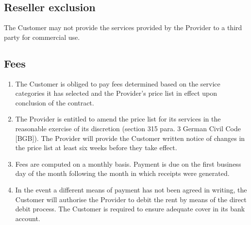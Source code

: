 \documentclass{terms}
\begin{document}
\subsection{Reseller exclusion}
The Customer may not provide the services provided by the Provider to a third party for commercial use.
\subsection{Fees}
\begin{enumerate}
\item The Customer is obliged to pay fees determined based on the service categories it has selected and the Provider's price list in effect upon conclusion of the contract.
\item The Provider is entitled to amend the price list for its services in the reasonable exercise of its discretion (section 315 para. 3 German Civil Code [BGB]). The Provider will provide the Customer written notice of changes in the price list at least six weeks before they take effect.
\item Fees are computed on a monthly basis. Payment is due on the first business day of the month following the month in which receipts were generated.
\item In the event a different means of payment has not been agreed in writing, the Customer will authorise the Provider to debit the rent by means of the direct debit process. The Customer is required to ensure adequate cover in its bank account.
\end{enumerate}
\end{document}
